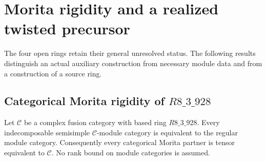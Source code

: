 \section{Morita rigidity and a realized twisted precursor}
\label{sec:m3-theoretical-retry}

The four open rings retain their general unresolved status. The
following results distinguish an actual auxiliary construction from
necessary module data and from a construction of a source ring.

\subsection{Categorical Morita rigidity of $R8\_3\_928$}
\begin{theorem}
Let $\mathcal C$ be a complex fusion category with based ring
$R8\_3\_928$. Every indecomposable semisimple $\mathcal C$-module
category is equivalent to the regular module category. Consequently
every categorical Morita partner is tensor equivalent to $\mathcal C$.
No rank bound on module categories is assumed.
\end{theorem}
